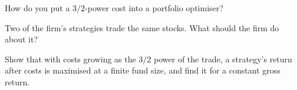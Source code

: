 \begin{interviewq}\label{iq:rs:transaction-costs-in-research:4}
How do you put a $3/2$-power cost into a portfolio optimiser?
\end{interviewq}

\begin{interviewq}\label{iq:rs:transaction-costs-in-research:5}
Two of the firm's strategies trade the same stocks. What should the firm do about it?
\end{interviewq}

\begin{interviewq}\label{iq:rs:transaction-costs-in-research:6}
Show that with costs growing as the $3/2$ power of the trade, a strategy's return after costs is maximised at a finite fund size, and find it for a constant gross
return.
\end{interviewq}
